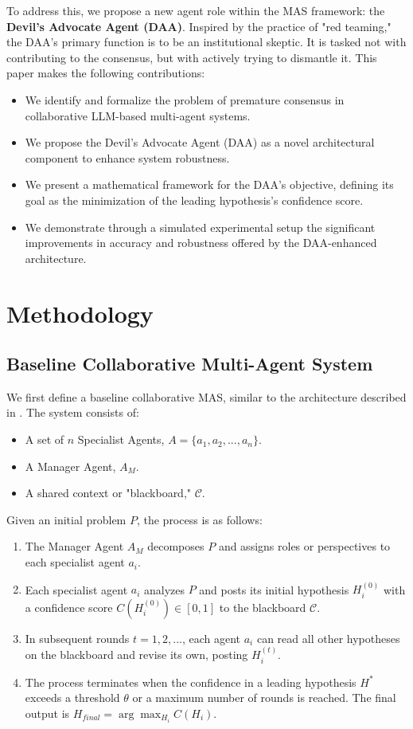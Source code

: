\documentclass{article}
\begin{document}
To address this, we propose a new agent role within the MAS framework: the \textbf{Devil's Advocate Agent (DAA)}. Inspired by the practice of "red teaming," the DAA's primary function is to be an institutional skeptic. It is tasked not with contributing to the consensus, but with actively trying to dismantle it. This paper makes the following contributions:
\begin{itemize}
    \item We identify and formalize the problem of premature consensus in collaborative LLM-based multi-agent systems.
    \item We propose the Devil's Advocate Agent (DAA) as a novel architectural component to enhance system robustness.
    \item We present a mathematical framework for the DAA's objective, defining its goal as the minimization of the leading hypothesis's confidence score.
    \item We demonstrate through a simulated experimental setup the significant improvements in accuracy and robustness offered by the DAA-enhanced architecture.
\end{itemize}

\section{Methodology}

\subsection{Baseline Collaborative Multi-Agent System}

We first define a baseline collaborative MAS, similar to the architecture described in \cite{lee2025automated}. The system consists of:
\begin{itemize}
    \item A set of $n$ Specialist Agents, $A = \{a_1, a_2, ..., a_n\}$.
    \item A Manager Agent, $A_M$.
    \item A shared context or "blackboard," $\mathcal{C}$.
\end{itemize}
Given an initial problem $P$, the process is as follows:
\begin{enumerate}
    \item The Manager Agent $A_M$ decomposes $P$ and assigns roles or perspectives to each specialist agent $a_i$.
    \item Each specialist agent $a_i$ analyzes $P$ and posts its initial hypothesis $H_i^{(0)}$ with a confidence score $C(H_i^{(0)}) \in [0, 1]$ to the blackboard $\mathcal{C}$.
    \item In subsequent rounds $t=1, 2, ...$, each agent $a_i$ can read all other hypotheses on the blackboard and revise its own, posting $H_i^{(t)}$.
    \item The process terminates when the confidence in a leading hypothesis $H^*$ exceeds a threshold $\theta$ or a maximum number of rounds is reached. The final output is $H_{final} = \arg\max_{H_i} C(H_i)$.
\end{enumerate}
\end{document}
